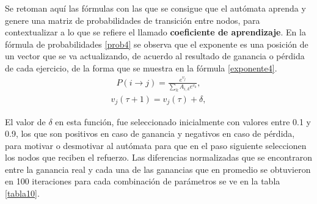 Se retoman aquí las fórmulas con las que se consigue que el autómata aprenda y genere una matriz de probabilidades de transición entre nodos, para contextualizar a lo que se refiere el llamado \textbf{coeficiente de aprendizaje}. En la fórmula de probabilidades \ref{prob4} se observa que el exponente es una posición de un vector que se va actualizando, de acuerdo al resultado de ganancia o pérdida de cada ejercicio, de la forma que se muestra en la fórmula \ref{exponente4}.
\begin{eqnarray}\label{prob4}
P(i \to j) = \frac{e^{v_j}}{\sum_k A_{i,k} e^{v_k}},
\end{eqnarray}
\begin{eqnarray}\label{exponente4}
v_j(\tau + 1) = v_j(\tau) + \delta,
\end{eqnarray}

El valor de $\delta$ en esta función, fue seleccionado inicialmente con valores entre 0.1 y 0.9, los que son positivos en caso de ganancia y negativos en caso de pérdida, para motivar o desmotivar al autómata para que en el paso siguiente seleccionen los nodos que reciben el refuerzo. Las diferencias normalizadas que se encontraron entre la ganancia real y cada una de las ganancias que en promedio se obtuvieron en 100 iteraciones para cada combinación de parámetros se ve en la tabla \ref{tabla10}.

